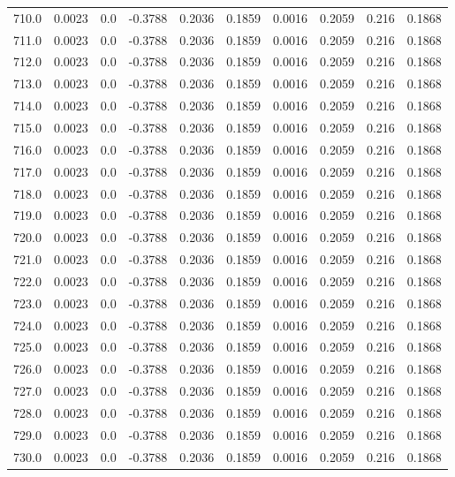 \begin{longtable}{lrrrrrrrrr}
710.0 & 0.0023 & 0.0 & -0.3788 & 0.2036 & 0.1859 & 0.0016 & 0.2059 & 0.216 & 0.1868 \\
711.0 & 0.0023 & 0.0 & -0.3788 & 0.2036 & 0.1859 & 0.0016 & 0.2059 & 0.216 & 0.1868 \\
712.0 & 0.0023 & 0.0 & -0.3788 & 0.2036 & 0.1859 & 0.0016 & 0.2059 & 0.216 & 0.1868 \\
713.0 & 0.0023 & 0.0 & -0.3788 & 0.2036 & 0.1859 & 0.0016 & 0.2059 & 0.216 & 0.1868 \\
714.0 & 0.0023 & 0.0 & -0.3788 & 0.2036 & 0.1859 & 0.0016 & 0.2059 & 0.216 & 0.1868 \\
715.0 & 0.0023 & 0.0 & -0.3788 & 0.2036 & 0.1859 & 0.0016 & 0.2059 & 0.216 & 0.1868 \\
716.0 & 0.0023 & 0.0 & -0.3788 & 0.2036 & 0.1859 & 0.0016 & 0.2059 & 0.216 & 0.1868 \\
717.0 & 0.0023 & 0.0 & -0.3788 & 0.2036 & 0.1859 & 0.0016 & 0.2059 & 0.216 & 0.1868 \\
718.0 & 0.0023 & 0.0 & -0.3788 & 0.2036 & 0.1859 & 0.0016 & 0.2059 & 0.216 & 0.1868 \\
719.0 & 0.0023 & 0.0 & -0.3788 & 0.2036 & 0.1859 & 0.0016 & 0.2059 & 0.216 & 0.1868 \\
720.0 & 0.0023 & 0.0 & -0.3788 & 0.2036 & 0.1859 & 0.0016 & 0.2059 & 0.216 & 0.1868 \\
721.0 & 0.0023 & 0.0 & -0.3788 & 0.2036 & 0.1859 & 0.0016 & 0.2059 & 0.216 & 0.1868 \\
722.0 & 0.0023 & 0.0 & -0.3788 & 0.2036 & 0.1859 & 0.0016 & 0.2059 & 0.216 & 0.1868 \\
723.0 & 0.0023 & 0.0 & -0.3788 & 0.2036 & 0.1859 & 0.0016 & 0.2059 & 0.216 & 0.1868 \\
724.0 & 0.0023 & 0.0 & -0.3788 & 0.2036 & 0.1859 & 0.0016 & 0.2059 & 0.216 & 0.1868 \\
725.0 & 0.0023 & 0.0 & -0.3788 & 0.2036 & 0.1859 & 0.0016 & 0.2059 & 0.216 & 0.1868 \\
726.0 & 0.0023 & 0.0 & -0.3788 & 0.2036 & 0.1859 & 0.0016 & 0.2059 & 0.216 & 0.1868 \\
727.0 & 0.0023 & 0.0 & -0.3788 & 0.2036 & 0.1859 & 0.0016 & 0.2059 & 0.216 & 0.1868 \\
728.0 & 0.0023 & 0.0 & -0.3788 & 0.2036 & 0.1859 & 0.0016 & 0.2059 & 0.216 & 0.1868 \\
729.0 & 0.0023 & 0.0 & -0.3788 & 0.2036 & 0.1859 & 0.0016 & 0.2059 & 0.216 & 0.1868 \\
730.0 & 0.0023 & 0.0 & -0.3788 & 0.2036 & 0.1859 & 0.0016 & 0.2059 & 0.216 & 0.1868 \\

\end{longtable}
